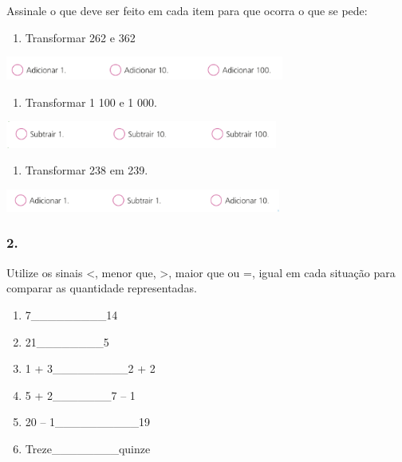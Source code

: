 Assinale o que deve ser feito em cada item para que ocorra o que se
pede:

\begin{enumerate}
\def\labelenumi{\alph{enumi})}
\item
  Transformar 262 e 362
\end{enumerate}

\includegraphics[width=3.60031in,height=0.30003in]{media/image18.png}

\begin{enumerate}
\def\labelenumi{\alph{enumi})}
\item
  Transformar 1 100 e 1 000.
\end{enumerate}

\includegraphics[width=3.51697in,height=0.35003in]{media/image19.png}

\begin{enumerate}
\def\labelenumi{\alph{enumi})}
\item
  Transformar 238 em 239.
\end{enumerate}

\includegraphics[width=3.56698in,height=0.29169in]{media/image20.png}

\subsubsection{2.}\label{section-17}

Utilize os sinais \textless{}, menor que, \textgreater{}, maior que ou
=, igual em cada situação para comparar as quantidade representadas.

\begin{enumerate}
\def\labelenumi{\alph{enumi})}
\item
  7\_\_\_\_\_\_\_\_\_14
\item
  21\_\_\_\_\_\_\_\_5
\item
  1 + 3\_\_\_\_\_\_\_\_\_2 + 2
\item
  5 + 2\_\_\_\_\_\_\_7 -- 1
\item
  20 -- 1\_\_\_\_\_\_\_\_\_\_19
\item
  Treze\_\_\_\_\_\_\_\_quinze
\end{enumerate}

